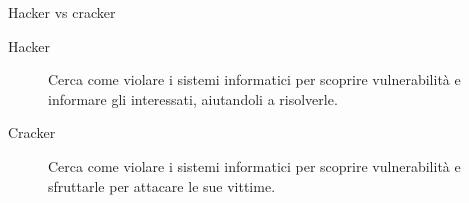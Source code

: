 
\begin{myframe}{Hacker vs cracker}
  \pause
  \begin{description}
    \item[Hacker] Cerca come violare i sistemi informatici per scoprire vulnerabilità e \pause informare gli interessati, aiutandoli a risolverle.
    \pause
    \item[Cracker] Cerca come violare i sistemi informatici per scoprire vulnerabilità e \pause sfruttarle per attacare le sue vittime.
  \end{description}
\end{myframe}
